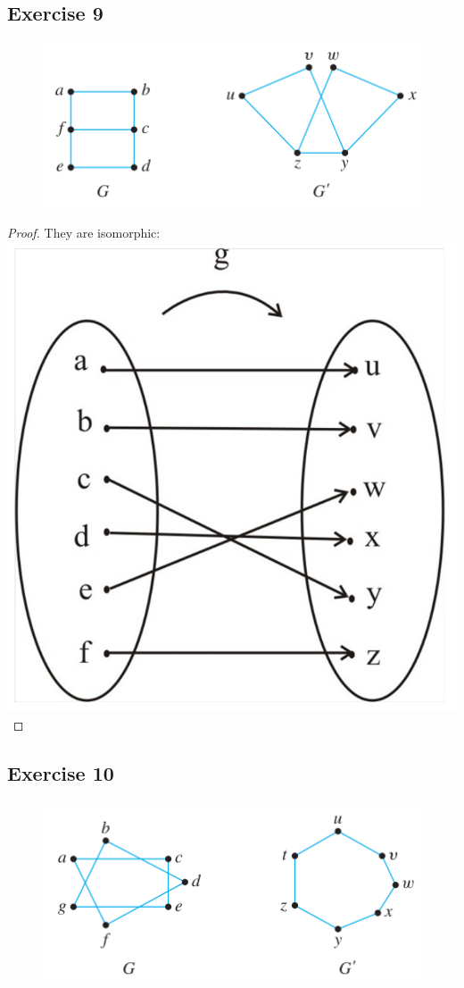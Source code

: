 \documentclass[14pt]{extarticle}
\begin{document}
\subsection{Exercise 9}
\begin{figure}[ht!]
    \centering
    \includegraphics[scale=0.5]{../images/10.3.9.png}
\end{figure}

\begin{proof}
    They are isomorphic:
    \includegraphics[scale=0.2]{../images/10.3.9.1.png}
\end{proof}

\subsection{Exercise 10}
\begin{figure}[ht!]
    \centering
    \includegraphics[scale=0.5]{../images/10.3.10.png}
\end{figure}
\end{document}
